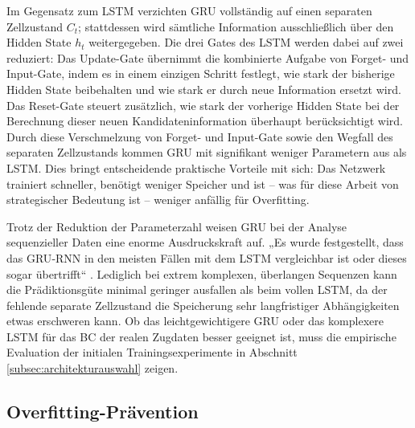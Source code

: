Im Gegensatz zum \gls{LSTM} verzichten \gls{GRU} vollständig auf einen separaten Zellzustand $C_t$; stattdessen wird sämtliche Information ausschließlich über den Hidden State $h_t$ weitergegeben. 
Die drei Gates des \gls{LSTM} werden dabei auf zwei reduziert: Das Update-Gate übernimmt die kombinierte Aufgabe von Forget- und Input-Gate, indem es in einem einzigen Schritt festlegt, wie stark der bisherige Hidden State beibehalten und wie stark er durch neue Information ersetzt wird. 
Das Reset-Gate steuert zusätzlich, wie stark der vorherige Hidden State bei der Berechnung dieser neuen Kandidateninformation überhaupt berücksichtigt wird. 
Durch diese Verschmelzung von Forget- und Input-Gate sowie den Wegfall des separaten Zellzustands kommen \gls{GRU} mit signifikant weniger Parametern aus als \gls{LSTM}. 
Dies bringt entscheidende praktische Vorteile mit sich: Das Netzwerk trainiert schneller, benötigt weniger Speicher und ist -- was für diese Arbeit von strategischer Bedeutung ist -- weniger anfällig für Overfitting.

Trotz der Reduktion der Parameterzahl weisen \gls{GRU} bei der Analyse sequenzieller Daten eine enorme Ausdruckskraft auf. 
„Es wurde festgestellt, dass das \gls{GRU}-\gls{RNN} in den meisten Fällen mit dem \gls{LSTM} vergleichbar ist oder dieses sogar übertrifft“ \cite[S.~2f.]{chap2_Dey17}. 
Lediglich bei extrem komplexen, überlangen Sequenzen kann die Prädiktionsgüte minimal geringer ausfallen als beim vollen \gls{LSTM}, da der fehlende separate Zellzustand die Speicherung sehr langfristiger Abhängigkeiten etwas erschweren kann. 
Ob das leichtgewichtigere \gls{GRU} oder das komplexere \gls{LSTM} für das \gls{BC} der realen Zugdaten besser geeignet ist, muss die empirische Evaluation der initialen Trainingsexperimente in Abschnitt \ref{subsec:architekturauswahl} zeigen.

\subsection{Overfitting-Prävention}
\label{sec:overfitting_praevention}


